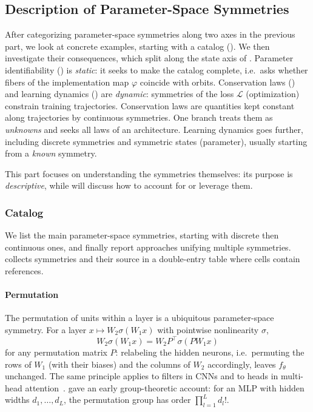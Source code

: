 \documentclass[mathematics,review,submit,moreauthors]{Definitions/mdpi}
\begin{document}
\subsection{Description of Parameter-Space Symmetries}\label{sec:descr-param-space-symmetries}
After categorizing parameter-space symmetries along two axes in the previous part, we look at concrete examples, starting with a catalog ().
We then investigate their consequences, which split along the state axis of .
Parameter identifiability () is \emph{static}: it seeks to make the catalog complete, i.e.\ asks whether fibers of the implementation map $\varphi$ coincide with orbits.
Conservation laws () and learning dynamics () are \emph{dynamic}: symmetries of the loss $\mathcal L$ (optimization) constrain training trajectories.
Conservation laws are quantities kept constant along trajectories by continuous symmetries.
One branch treats them as \emph{unknowns} and seeks all laws of an architecture.
Learning dynamics goes further, including discrete symmetries and symmetric states (parameter), usually starting from a \emph{known} symmetry.

This part focuses on understanding the symmetries themselves: its purpose is \emph{descriptive}, while  will discuss how to account for or leverage them.

\subsubsection{Catalog}\label{sec:catalog-param-space-symmetries}
We list the main parameter-space symmetries, starting with discrete then continuous ones, and finally report approaches unifying multiple symmetries.
 collects symmetries and their source in a double-entry table where cells contain references.

\paragraph{Permutation}
The permutation of units within a layer is a ubiquitous parameter-space symmetry.
For a layer $x\mapsto W_2\sigma(W_1x)$ with pointwise nonlinearity $\sigma$,
\begin{equation*}
    W_2\sigma(W_1x)=W_2P^{\top}\sigma(PW_1x)
\end{equation*}
for any permutation matrix $P$: relabeling the hidden neurons, i.e.\ permuting the rows of $W_1$ (with their biases) and the columns of $W_2$ accordingly, leaves $f_\theta$ unchanged.
The same principle applies to filters in CNNs and to heads in multi-head attention~\citep{tran2025iclr}.
\citet{hecht-nielsen1990anc} gave an early group-theoretic account: for an MLP with hidden widths $d_1,\dots,d_L$, the permutation group has order $\prod_{l=1}^{L}d_l!$.
\end{document}
